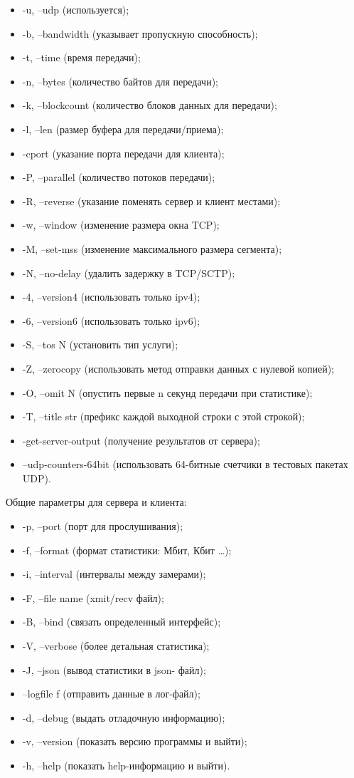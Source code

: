 \documentclass[
  13pt,
  fontsize=13pt,
  russian,
  a4paper,
,captions=tableheading
]{scrreprt}
\providecommand{\tightlist}{%
  \setlength{\itemsep}{0pt}\setlength{\parskip}{0pt}}
\begin{document}
\begin{itemize}
\tightlist
\item
  -u, --udp (используется);
\item
  -b, --bandwidth (указывает пропускную способность);
\item
  -t, --time (время передачи);
\item
  -n, --bytes (количество байтов для передачи);
\item
  -k, --blockcount (количество блоков данных для передачи);
\item
  -l, --len (размер буфера для передачи/приема);
\item
  -cport (указание порта передачи для клиента);
\item
  -P, --parallel (количество потоков передачи);
\item
  -R, --reverse (указание поменять сервер и клиент местами);
\item
  -w, --window (изменение размера окна TCP);
\item
  -M, --set-mss (изменение максимального размера сегмента);
\item
  -N, --no-delay (удалить задержку в TCP/SCTP);
\item
  -4, --version4 (использовать только ipv4);
\item
  -6, --version6 (использовать только ipv6);
\item
  -S, --tos N (установить тип услуги);
\item
  -Z, --zerocopy (использовать метод отправки данных с нулевой копией);
\item
  -O, --omit N (опустить первые n секунд передачи при статистике);
\item
  -T, --title str (префикс каждой выходной строки с этой строкой);
\item
  -get-server-output (получение результатов от сервера);
\item
  --udp-counters-64bit (использовать 64-битные счетчики в тестовых
  пакетах UDP).
\end{itemize}

Общие параметры для сервера и клиента:

\begin{itemize}
\tightlist
\item
  -p, --port (порт для прослушивания);
\item
  -f, --format (формат статистики: Мбит, Кбит \ldots);
\item
  -i, --interval (интервалы между замерами);
\item
  -F, --file name (xmit/recv файл);
\item
  -B, --bind (связать определенный интерфейс);
\item
  -V, --verbose (более детальная статистика);
\item
  -J, --json (вывод статистики в json- файл);
\item
  --logfile f (отправить данные в лог-файл);
\item
  -d, --debug (выдать отладочную информацию);
\item
  -v, --version (показать версию программы и выйти);
\item
  -h, --help (показать help-информацию и выйти).
\end{itemize}
\end{document}
